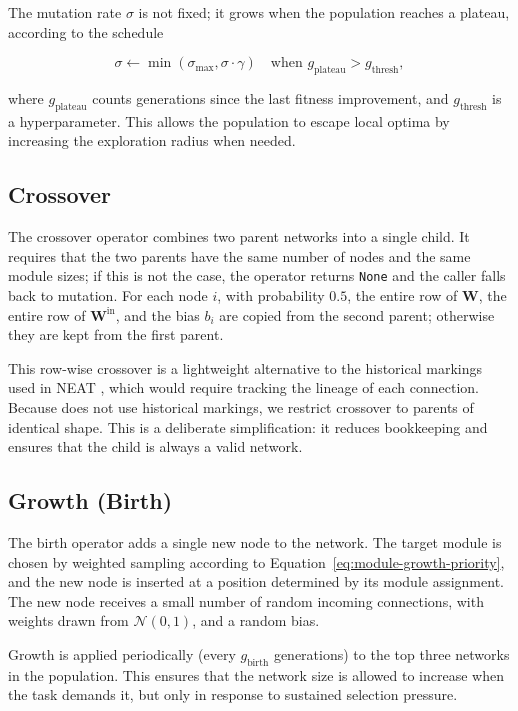 The mutation rate $\sigma$ is not fixed; it grows when the population
reaches a plateau, according to the schedule

\begin{equation}
  \sigma \gets \min(\sigma_{\max}, \sigma \cdot \gamma)
  \quad \text{when } g_{\text{plateau}} > g_{\text{thresh}},
  \label{eq:sigma-adaptation}
\end{equation}

where $g_{\text{plateau}}$ counts generations since the last fitness
improvement, and $g_{\text{thresh}}$ is a hyperparameter. This allows
the population to escape local optima by increasing the exploration
radius when needed.

\subsection{Crossover}

The crossover operator combines two parent networks into a single
child. It requires that the two parents have the same number of nodes
and the same module sizes; if this is not the case, the operator
returns \texttt{None} and the caller falls back to mutation. For each
node $i$, with probability $0.5$, the entire row of $\mathbf{W}$,
the entire row of $\mathbf{W}^{\text{in}}$, and the bias $b_i$ are
copied from the second parent; otherwise they are kept from the first
parent.

This row-wise crossover is a lightweight alternative to the historical
markings used in NEAT \citep{stanley2002evolving}, which would require
tracking the lineage of each connection. Because \modnet{} does not
use historical markings, we restrict crossover to parents of identical
shape. This is a deliberate simplification: it reduces bookkeeping and
ensures that the child is always a valid network.

\subsection{Growth (Birth)}

The birth operator adds a single new node to the network. The target
module is chosen by weighted sampling according to
Equation~\ref{eq:module-growth-priority}, and the new node is inserted
at a position determined by its module assignment. The new node
receives a small number of random incoming connections, with weights
drawn from $\mathcal{N}(0, 1)$, and a random bias.

Growth is applied periodically (every $g_{\text{birth}}$ generations)
to the top three networks in the population. This ensures that the
network size is allowed to increase when the task demands it, but
only in response to sustained selection pressure.

